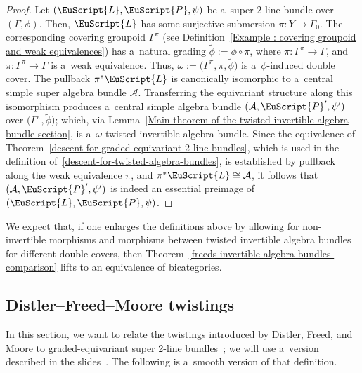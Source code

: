\documentclass[pdftex]{sigma}
\numberwithin{equation}{section}
\def\mathscr#1{\EuScript{#1}}
\begin{document}
\begin{proof}
Let $(\mathscr{L},\mathscr{P},\psi)$ be a~super 2-line bundle over $(\Gamma,\phi)$. Then, $\mathscr{L}$ has some surjective submersion $\pi\colon Y \to \Gamma_0$. The corresponding covering groupoid $\Gamma^{\pi}$ (see Definition~\ref{Example : covering groupoid and weak equivalences}) has a~natural grading $\tilde\phi := \phi \circ \pi$, where $\pi\colon \Gamma^{\pi} \to \Gamma$, and $\pi\colon \Gamma^{\pi} \to \Gamma$ is a~weak equivalence. Thus, $\omega := \bigl(\Gamma^{\pi},\pi,\tilde\phi\bigr)$ is a~$\phi$-induced double cover. The pullback $\pi^{*}\mathscr{L}$ is canonically isomorphic to a~central simple super algebra bundle $\mathcal{A}$. Transferring the equivariant structure along this isomorphism produces a~central simple algebra bundle $(\mathcal{A},\mathscr{P}',\psi')$ over $\big(\Gamma^{\pi},\tilde\phi\big)$; which, via Lemma~\ref{Main theorem of the twisted invertible algebra bundle section}, is a~$\omega$-twisted invertible algebra bundle. Since the equivalence of Theorem~\ref{descent-for-graded-equivariant-2-line-bundles}, which is used in the definition of~\eqref{descent-for-twisted-algebra-bundles}, is established by pullback along the weak equivalence $\pi$, and $\pi^{*}\mathscr{L}\cong \mathcal{A}$, it follows that~${(\mathcal{A},\mathscr{P}',\psi')}$ is indeed an essential preimage of $(\mathscr{L},\mathscr{P},\psi)$.
\end{proof}

We expect that, if one enlarges the definitions above by allowing for non-invertible morphisms and morphisms between twisted invertible algebra bundles for different double covers, then
Theorem~\ref{freeds-invertible-algebra-bundles-comparison} lifts to an equivalence of bicategories.

\subsection{Distler--Freed--Moore twistings} \label{Distler Freed Moore twistings}


In this section, we want to relate the twistings introduced by Distler, Freed, and Moore to
graded-equivariant super 2-line bundles~\cite{Distler2011,distler2010spin}; we will use a~version described in the slides~\cite{Freed2009Slides}. The following is a~smooth version
of that definition.
\end{document}
